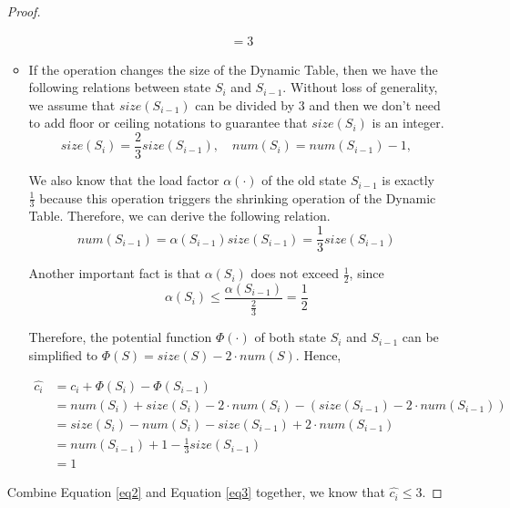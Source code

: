 \documentclass[12pt,a4paper]{article}
\theoremstyle{definition}
\begin{document}
\begin{enumerate}
\begin{proof}
\begin{itemize}
\begin{equation}
\begin{aligned}
              & = 3
    \end{aligned}
    \label{eq2}
    \end{equation}
    \item If the operation changes the size of the Dynamic Table, then we have the following relations between state $S_i$ and $S_{i-1}$. Without loss of generality, we assume that $size(S_{i-1})$ can be divided by $3$ and then we don't need to add floor or ceiling notations to guarantee that $size(S_i)$ is an integer.
    \begin{displaymath}
    size(S_i) = \frac{2}{3} size(S_{i-1}), \quad num(S_i) = num(S_{i-1}) - 1,
    \end{displaymath}

    We also know that the load factor $\alpha(\cdot)$ of the old state $S_{i-1}$ is exactly $\frac{1}{3}$ because this operation triggers the shrinking operation of the Dynamic Table. Therefore, we can derive the following relation.
    \begin{displaymath}
    num(S_{i-1}) = \alpha(S_{i-1})size(S_{i-1}) = \frac{1}{3} size(S_{i-1})
    \end{displaymath}

    Another important fact is that $\alpha(S_i)$ does not exceed $\frac{1}{2}$, since
    \begin{displaymath}
    \alpha(S_i) \leq \frac{\alpha(S_{i-1})}{\frac{2}{3}} = \frac{1}{2}
    \end{displaymath}

    Therefore, the potential function $\Phi(\cdot)$ of both state $S_i$ and $S_{i-1}$ can be simplified to $\Phi(S) = size(S) - 2\cdot num(S)$. Hence,

    \begin{equation}
    \begin{aligned}
    \hat{c_i} & = c_i + \Phi(S_i) - \Phi(S_{i-1}) \\
              & = num(S_i) + size(S_i) - 2\cdot num(S_i) - (size(S_{i-1}) - 2 \cdot num(S_{i-1})) \\
              & = size(S_i) - num(S_i) - size(S_{i-1}) + 2 \cdot num(S_{i-1}) \\
              & = num(S_{i-1}) + 1 - \frac{1}{3} size(S_{i-1}) \\
              & = 1
    \end{aligned}
    \label{eq3}
    \end{equation}
    \end{itemize}

    Combine Equation \eqref{eq2} and Equation \eqref{eq3} together, we know that $\hat{c_i} \leq 3$.


\end{proof}
\end{enumerate}
\end{document}
